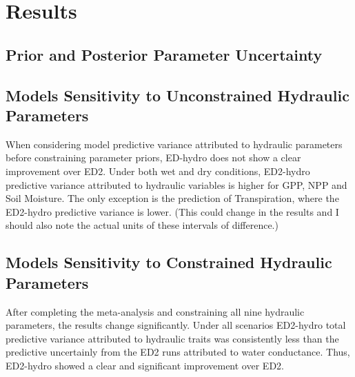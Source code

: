 \newpage
{}
\section*{Results}

\subsection*{Prior and Posterior Parameter Uncertainty}



\subsection*{Models Sensitivity to Unconstrained Hydraulic Parameters}


When considering model predictive variance attributed to hydraulic parameters before constraining parameter priors, ED-hydro does not show a clear improvement over ED2. Under both wet and dry conditions, ED2-hydro predictive variance attributed to hydraulic variables is higher for GPP, NPP and Soil Moisture. The only exception is the prediction of Transpiration, where the ED2-hydro predictive variance is lower. (This could change in the results and I should also note the actual units of these intervals of difference.) 

\subsection*{Models Sensitivity to Constrained Hydraulic Parameters} 

After completing the meta-analysis and constraining all nine hydraulic parameters, the results change significantly.  Under all scenarios ED2-hydro total predictive variance attributed to hydraulic traits was consistently less than the predictive uncertainly from the ED2 runs attributed to water conductance. Thus, ED2-hydro showed a clear and significant improvement over ED2. 


